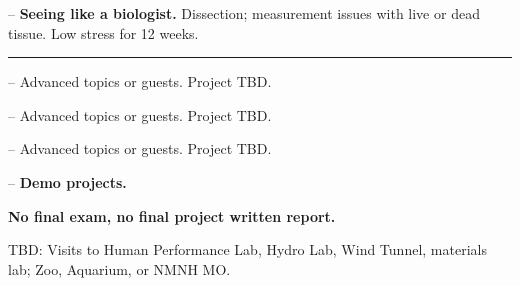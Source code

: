 \documentclass{exam}
\begin{document}
\begin{questions}
\question \printdate{\courseWeekTwelve} -- \textbf{Seeing like a biologist.} Dissection; measurement issues with live or dead tissue. Low stress for 12 weeks.

\vspace{1em}
\hrule
\vspace{1em}

\question \printdate{\courseWeekThirteen} -- Advanced topics or guests. Project TBD.

\question \printdate{\courseWeekFourteen} -- Advanced topics or guests. Project TBD.

\question \printdate{\courseWeekFifteen} -- Advanced topics or guests. Project TBD.

\question \printdate{\courseWeekSixteen} -- \textbf{Demo projects.} 
\end{questions}

\textbf{No final exam, no final project written report.}

TBD: Visits to Human Performance Lab, Hydro Lab, Wind Tunnel, materials lab; Zoo, Aquarium, or NMNH MO.
\end{document}
